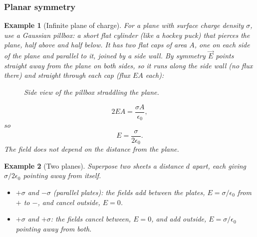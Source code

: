 \documentclass{article}
\newtheorem*{example}{Example}
\begin{document}
\subsubsection{Planar symmetry}
\begin{example}[Infinite plane of charge]
    For a plane with surface charge density $\sigma$, use a Gaussian pillbox: a short flat cylinder (like a hockey puck) that pierces the plane, half above and half below. It has two flat caps of area $A$, one on each side of the plane and parallel to it, joined by a side wall. By symmetry $\vec{E}$ points straight away from the plane on both sides, so it runs along the side wall (no flux there) and straight through each cap (flux $EA$ each):
    \begin{figure}[H]
        \centering
        \caption{Side view of the pillbox straddling the plane.}
    \end{figure}
    \[2EA = \frac{\sigma A}{\epsilon_0},\]
    so
    \begin{equation}
        E = \frac{\sigma}{2\epsilon_0}.
    \end{equation}
    The field does not depend on the distance from the plane.
\end{example}
\begin{example}[Two planes]
    Superpose two sheets a distance $d$ apart, each giving $\sigma/2\epsilon_0$ pointing away from itself.
    \begin{itemize}
        \item $+\sigma$ and $-\sigma$ (parallel plates): the fields add between the plates, $E = \sigma/\epsilon_0$ from $+$ to $-$, and cancel outside, $E = 0$.
        \item $+\sigma$ and $+\sigma$: the fields cancel between, $E = 0$, and add outside, $E = \sigma/\epsilon_0$ pointing away from both.
    \end{itemize}
\end{example}
\end{document}
